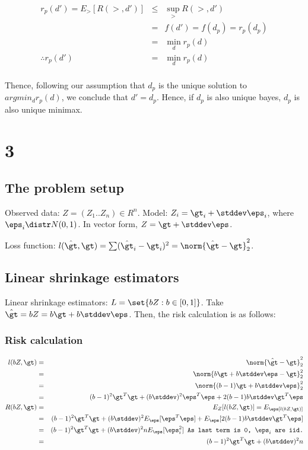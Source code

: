\documentclass{article}
\begin{document}
\begin{eqnarray*}
r_p(d') = E_\gt[R(\gt, d')] &\leq& \sup_\gt R(\gt, d')\\
&=& f(d') = f(d_p) = r_p(d_p)\\
&=& \min_d r_p(d)\\
\therefore r_p(d') &=& \min_d r_p(d)\\
\end{eqnarray*}

Thence, following our assumption that $d_p$ is the unique solution to\\ $argmin_d r_p(d)$, we conclude that $d' = d_p$. Hence, if $d_p$ is also unique bayes, $d_p$ is also unique minimax.

\section{3}
\subsection{The problem setup}
Observed data: $Z = (Z_1 .. Z_n) \in R^{n}$. Model: $Z_i = \gt_i + \stddev \eps_i$, where $\eps_i \distr N(0, 1)$. In vector form, $Z = \gt + \stddev \eps$.

Loss function: $l(\hat{\gt}, \gt) = \sum (\hat{\gt}_i - \gt_i)^{2} = \norm{\hat{\gt} - \gt}_2^{2}$.

\subsection{Linear shrinkage estimators}
Linear shrinkage estimators: $L = \set{bZ: b \in [0, 1]}$. Take $\hat{\gt} = bZ = b\gt + b\stddev \eps$. Then, the risk calculation is as follows:

\subsubsection{Risk calculation}
\begin{eqnarray*}
l(bZ, \gt) &=& \norm{\hat{\gt} - \gt}_2^{2}\\
&=& \norm{b\gt + b\stddev \eps - \gt}_2^{2}\\
&=& \norm{(b-1)\gt + b\stddev \eps}_2^{2}\\
&=& (b-1)^{2}\gt^{T}\gt + (b\stddev)^{2} \eps^{T}\eps + 2(b-1)b\stddev\gt^{T}\eps \\
R(bZ, \gt) &=& E_Z[l(bZ, \gt)] = E_\eps[l(bZ, \gt)]\\
&=& (b-1)^{2}\gt^{T}\gt + (b\stddev)^{2} E_{\eps}[\eps^{T}\eps] + E_{\eps}[2(b-1)b\stddev\gt^{T}\eps]\\
&=& (b-1)^{2}\gt^{T}\gt + (b\stddev)^{2} n E_{\eps}[\eps_i^{2}] \texttt{ As last term is 0, $\eps_i$ are iid.}\\
&=& (b-1)^{2}\gt^{T}\gt + (b\stddev)^{2}n \\
\end{eqnarray*}
\end{document}
